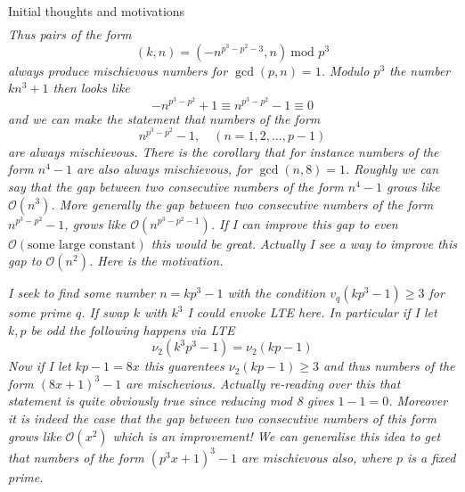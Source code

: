 \documentclass{article}
\begin{document}
\begin{hint}{Initial thoughts and motivations}
\[\begin{aligned}
\end{aligned}
\]
\textit{Thus pairs of the form}
$$
(k,n) = (-n^{p^3 - p^2 - 3}, n) \ \text{mod } p^3
$$
\textit{always produce mischievous numbers for $\gcd(p,n)=1$. Modulo
$p^3$ the number $kn^3 + 1$ then looks like}
$$
-n^{p^3 - p^2} + 1 \equiv n^{p^3 - p^2} - 1 \equiv 0
$$
\textit{and we can make the statement that numbers of the form}
$$
n^{p^3 - p^2} - 1, \quad (n = 1,2,\ldots,p-1)
$$
\textit{are always mischievous. There is the corollary that
for instance numbers of the form $n^4 - 1$ are also always mischievous,
for $\gcd(n, 8) = 1$. Roughly we can say that the gap between two
consecutive numbers of the form $n^4 - 1$ grows like $\mathcal{O}(n^3)$.
More generally the gap between two consecutive numbers of the form
$n^{p^3 - p^2} - 1$, grows like $\mathcal{O}(n^{p^3 - p^2 -1})$. If I can
improve this gap to even $\mathcal{O}(\text{some large constant})$
this would be great. Actually I see a way to improve this gap to
$\mathcal{O}(n^2)$. Here is the motivation.} \vspace{0.2cm}

\textit{
I seek to find some number $n = kp^3 - 1$ with the condition
$v_q (kp^3 - 1) \geq 3$ for some prime $q$. If swap $k$ with $k^3$ I
could envoke LTE here. In particular if I let $k, p$ be odd the following
happens via LTE}
$$
\nu_2\left( k^3 p^3 - 1 \right) = \nu_2 (kp - 1)
$$
\textit{Now if I let $kp - 1 = 8x$ this guarentees $\nu_2(kp - 1) \geq 3$
and thus numbers of the form $(8x + 1)^3 - 1$ are mischevious. Actually
re-reading over this that statement is quite obviously true since
reducing mod 8 gives $1 - 1 = 0$. Moreover it is indeed the case that the
gap between two consecutive numbers of this form grows like
$\mathcal{O}(x^2)$ which is an improvement! We can generalise this idea
to get that numbers of the form $(p^3 x  + 1)^3 - 1$ are mischievous also,
where $p$ is a fixed prime.
}
\vspace{0.2cm}


\end{hint}
\end{document}
